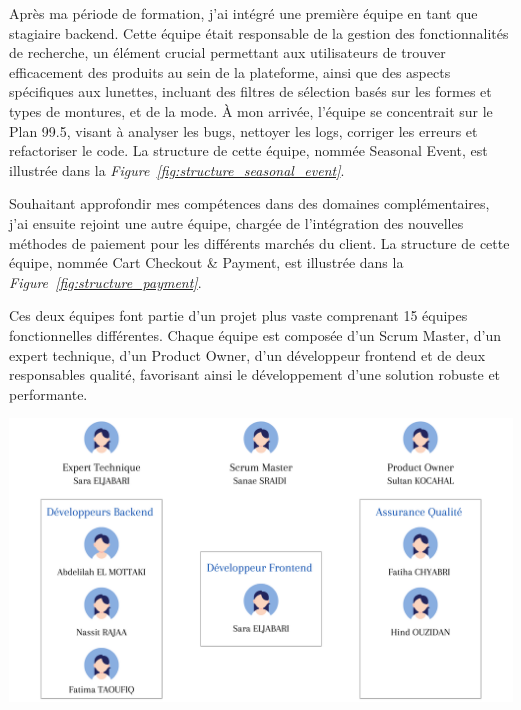 Après ma période de formation, j’ai intégré une première équipe en tant que stagiaire backend. Cette équipe était responsable de la gestion des fonctionnalités de recherche, un élément crucial permettant aux utilisateurs de trouver efficacement des produits au sein de la plateforme, ainsi que des aspects spécifiques aux lunettes, incluant des filtres de sélection basés sur les formes et types de montures, et de la mode. À mon arrivée, l'équipe se concentrait sur le Plan 99.5, visant à analyser les bugs, nettoyer les logs, corriger les erreurs et refactoriser le code. La structure de cette équipe, nommée Seasonal Event, est illustrée dans la \textit{Figure~\ref{fig:structure_seasonal_event}}.

Souhaitant approfondir mes compétences dans des domaines complémentaires, j'ai ensuite rejoint une autre équipe, chargée de l’intégration des nouvelles méthodes de paiement pour les différents marchés du client. La structure de cette équipe, nommée Cart Checkout & Payment, est illustrée dans la \textit{Figure~\ref{fig:structure_payment}}.

Ces deux équipes font partie d'un projet plus vaste comprenant 15 équipes fonctionnelles différentes. Chaque équipe est composée d'un Scrum Master, d'un expert technique, d'un Product Owner, d'un développeur frontend et de deux responsables qualité, favorisant ainsi le développement d'une solution robuste et performante.

\begin{center}
    \centering
    \includegraphics[width=19cm]{Figures/Seasonal Event Team.png}
    \label{fig:structure_seasonal_event}
\end{center}

